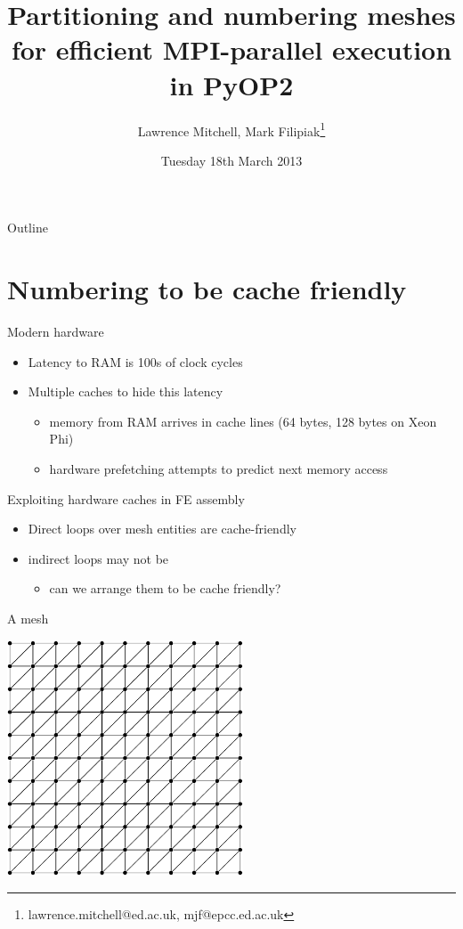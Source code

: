\documentclass[presentation]{beamer}
\author{Lawrence Mitchell, Mark Filipiak\thanks{lawrence.mitchell@ed.ac.uk, mjf@epcc.ed.ac.uk}}
\date{Tuesday 18th March 2013}
\title{Partitioning and numbering meshes for efficient MPI-parallel execution in PyOP2}
\begin{document}
\maketitle
\begin{frame}{Outline}
\tableofcontents
\end{frame}

\section{Numbering to be cache friendly}
\label{sec:orgheadline10}

\begin{frame}[label={sec:orgheadline1}]{Modern hardware}
\begin{itemize}
\item Latency to RAM is 100s of clock cycles
\item Multiple caches to hide this latency
\begin{itemize}
\item memory from RAM arrives in cache lines (64 bytes, 128 bytes on
Xeon Phi)
\item hardware prefetching attempts to predict next memory access
\end{itemize}
\end{itemize}
\end{frame}

\begin{frame}[label={sec:orgheadline2}]{Exploiting hardware caches in FE assembly}
\begin{itemize}
\item Direct loops over mesh entities are cache-friendly
\item indirect loops may not be
\begin{itemize}
\item can we arrange them to be cache friendly?
\end{itemize}
\end{itemize}
\end{frame}

\begin{frame}[label={sec:orgheadline3}]{A mesh}
\begin{center}
\includegraphics[width=7cm]{03-18-FEniCS-mesh-numbering.figures/mesh}
\end{center}
\end{frame}
\end{document}
